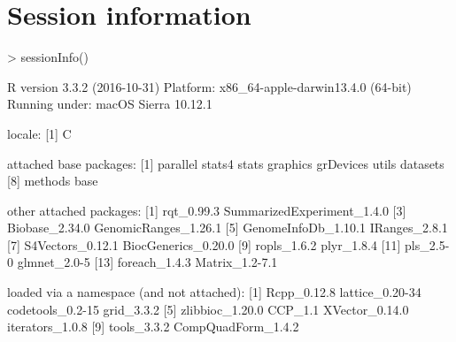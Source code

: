 \documentclass{article}
\begin{document}
\section{Session information}
\begin{Schunk}
\begin{Sinput}
> sessionInfo()
\end{Sinput}
\begin{Soutput}
R version 3.3.2 (2016-10-31)
Platform: x86_64-apple-darwin13.4.0 (64-bit)
Running under: macOS Sierra 10.12.1

locale:
[1] C

attached base packages:
[1] parallel  stats4    stats     graphics  grDevices utils     datasets 
[8] methods   base     

other attached packages:
 [1] rqt_0.99.3                 SummarizedExperiment_1.4.0
 [3] Biobase_2.34.0             GenomicRanges_1.26.1      
 [5] GenomeInfoDb_1.10.1        IRanges_2.8.1             
 [7] S4Vectors_0.12.1           BiocGenerics_0.20.0       
 [9] ropls_1.6.2                plyr_1.8.4                
[11] pls_2.5-0                  glmnet_2.0-5              
[13] foreach_1.4.3              Matrix_1.2-7.1            

loaded via a namespace (and not attached):
 [1] Rcpp_0.12.8        lattice_0.20-34    codetools_0.2-15   grid_3.3.2        
 [5] zlibbioc_1.20.0    CCP_1.1            XVector_0.14.0     iterators_1.0.8   
 [9] tools_3.3.2        CompQuadForm_1.4.2
\end{Soutput}
\end{Schunk}
\clearpage
\end{document}
